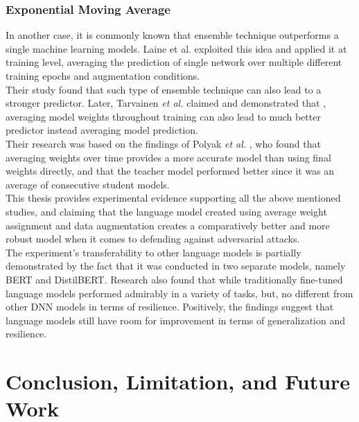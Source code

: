 \documentclass[%
	BCOR=8mm, %
	DIV=12,
	toc=bibliography, %
	toc=listof, %
	oneside, %
	egregdoesnotlikesansseriftitles, %
	]{scrbook}
\begin{document}
\subsection{Exponential Moving Average}
In another case, it is commonly known that ensemble technique outperforms a single machine learning models. Laine et al. \cite{laine_temporal_2017} exploited this idea and applied it at training level, averaging the prediction of single network over multiple different training epochs and augmentation conditions. \\
Their study found that such type of ensemble technique can also lead to a stronger predictor. Later,  Tarvainen \textit{et al.} \cite{tarvainen_mean_2018} claimed and demonstrated that , averaging model weights throughout training can also lead to much better predictor instead averaging model prediction. \\
Their research was based on the findings of Polyak \textit{et al.} \cite{polyak_acceleration_1992}, who found that averaging weights over time provides a more accurate model than using final weights directly, and that the teacher model performed better since it was an average of consecutive student models. \\
This thesis provides experimental evidence supporting all the above mentioned studies, and claiming that the language model created using average weight assignment and data augmentation creates a comparatively better and more robust model when it comes to defending against adversarial attacks.\\
The experiment's transferability to other language models is partially demonstrated by the fact that it was conducted in two separate models, namely BERT and DistilBERT. Research also found that while traditionally fine-tuned language models performed admirably in a variety of tasks, but, no different from other DNN models in terms of resilience. Positively, the findings suggest that language models still have room for improvement in terms of generalization and resilience.
\chapter{Conclusion, Limitation, and Future Work}
\label{chapter:conclusion}
\end{document}
